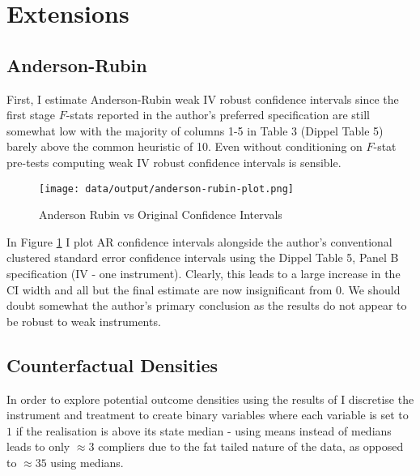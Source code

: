 \documentclass[12pt]{article}
\begin{document}
% 


\section{Extensions}
\subsection{Anderson-Rubin}

First, I estimate Anderson-Rubin weak IV robust confidence intervals since the first stage $F$-stats reported in the author's preferred 
specification are still somewhat low with the majority of columns 1-5 in Table 3 (Dippel Table 5) barely above the common heuristic of 10. Even
without conditioning on $F$-stat pre-tests computing weak IV robust confidence intervals is sensible.

\begin{figure}[htbp]
    \centering
    \texttt{[image: data/output/anderson-rubin-plot.png]}
    \caption{Anderson Rubin vs Original Confidence Intervals}
    \label{AR}
\end{figure}
In Figure \ref{AR} I plot AR confidence intervals alongside the author's conventional clustered standard error confidence intervals using the Dippel Table 5, Panel B specification (IV - one instrument).
Clearly, this leads to a large increase in the CI width and all but the final estimate are now insignificant from 0. We should doubt somewhat the author's primary conclusion as the results
do not appear to be robust to weak instruments.
\subsection{Counterfactual Densities}
In order to explore potential outcome densities using the results of \cite{imbens-rubin}
I discretise the instrument and treatment to create binary variables where each variable is set to $1$ if the realisation is above its
state median - using means instead of medians leads to only $\approx 3$ compliers due to the fat tailed nature of the data, as opposed to $\approx 35$ using medians.
\end{document}
